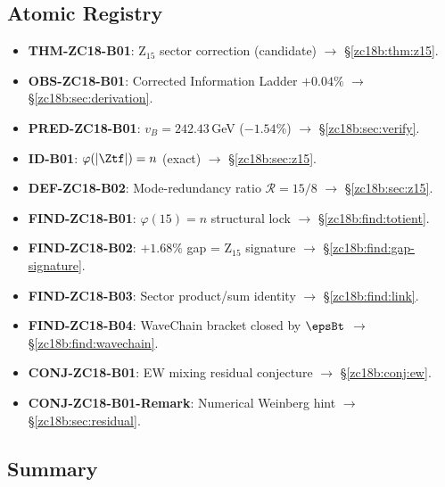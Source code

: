 \documentclass[12pt, a4paper]{article}
\begin{document}
\subsection{Atomic Registry}
\label{zc18b:sec:registry}

\begin{formalbox}[title={Atomic Units Introduced by ZC18 Track~B (11 new units)}]
\begin{itemize}[leftmargin=*, noitemsep]
  \item \textbf{THM-ZC18-B01}: Z$_{15}$ sector correction (candidate)
    $\to$ \S\ref{zc18b:thm:z15}.
  \item \textbf{OBS-ZC18-B01}: Corrected Information Ladder $+0.04\%$
    $\to$ \S\ref{zc18b:sec:derivation}.
  \item \textbf{PRED-ZC18-B01}: $v_B = 242.43$\,GeV ($-1.54\%$)
    $\to$ \S\ref{zc18b:sec:verify}.
  \item \textbf{ID-B01}: $\varphi(|\Ztf|) = n$ (exact)
    $\to$ \S\ref{zc18b:sec:z15}.
  \item \textbf{DEF-ZC18-B02}: Mode-redundancy ratio $\mathcal{R}=15/8$
    $\to$ \S\ref{zc18b:sec:z15}.
  \item \textbf{FIND-ZC18-B01}: $\varphi(15)=n$ structural lock
    $\to$ \S\ref{zc18b:find:totient}.
  \item \textbf{FIND-ZC18-B02}: $+1.68\%$ gap = Z$_{15}$ signature
    $\to$ \S\ref{zc18b:find:gap-signature}.
  \item \textbf{FIND-ZC18-B03}: Sector product/sum identity
    $\to$ \S\ref{zc18b:find:link}.
  \item \textbf{FIND-ZC18-B04}: WaveChain bracket closed by $\epsBt$
    $\to$ \S\ref{zc18b:find:wavechain}.
  \item \textbf{CONJ-ZC18-B01}: EW mixing residual conjecture
    $\to$ \S\ref{zc18b:conj:ew}.
  \item \textbf{CONJ-ZC18-B01-Remark}: Numerical Weinberg hint
    $\to$ \S\ref{zc18b:sec:residual}.
\end{itemize}
\end{formalbox}

\subsection{Summary}
\label{zc18b:sec:summary}
\end{document}
